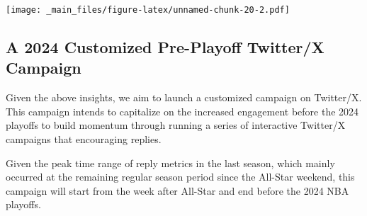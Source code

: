\documentclass[
]{book}
\newenvironment{Shaded}{\begin{snugshade}}{\end{snugshade}}
\newcommand{\AttributeTok}[1]{\textcolor[rgb]{0.13,0.29,0.53}{#1}}
\newcommand{\DecValTok}[1]{\textcolor[rgb]{0.00,0.00,0.81}{#1}}
\newcommand{\FloatTok}[1]{\textcolor[rgb]{0.00,0.00,0.81}{#1}}
\newcommand{\FunctionTok}[1]{\textcolor[rgb]{0.13,0.29,0.53}{\textbf{#1}}}
\newcommand{\NormalTok}[1]{#1}
\newcommand{\OtherTok}[1]{\textcolor[rgb]{0.56,0.35,0.01}{#1}}
\newcommand{\SpecialCharTok}[1]{\textcolor[rgb]{0.81,0.36,0.00}{\textbf{#1}}}
\newcommand{\StringTok}[1]{\textcolor[rgb]{0.31,0.60,0.02}{#1}}
\begin{document}
\begin{Shaded}
\end{Shaded}

\texttt{[image: \_main\_files/figure-latex/unnamed-chunk-20-2.pdf]}

\hypertarget{a-2024-customized-pre-playoff-twitterx-campaign}{%
\subsection{A 2024 Customized Pre-Playoff Twitter/X Campaign}\label{a-2024-customized-pre-playoff-twitterx-campaign}}

Given the above insights, we aim to launch a customized campaign on Twitter/X. This campaign intends to capitalize on the increased engagement before the 2024 playoffs to build momentum through running a series of interactive Twitter/X campaigns that encouraging replies.

Given the peak time range of reply metrics in the last season, which mainly occurred at the remaining regular season period since the All-Star weekend, this campaign will start from the week after All-Star and end before the 2024 NBA playoffs.
\end{document}
